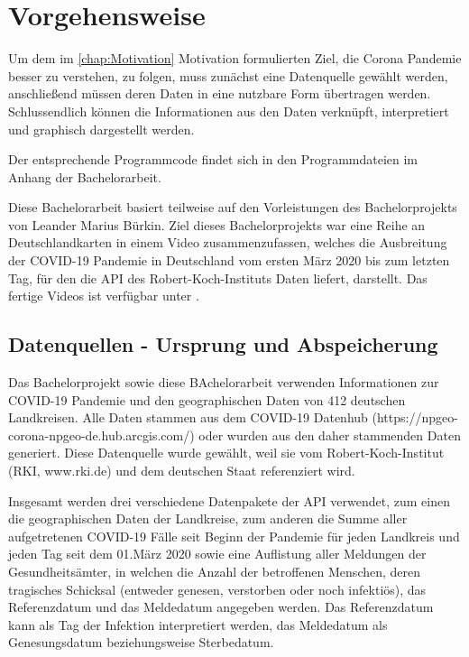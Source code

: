 \chapter{Vorgehensweise}\label{chap:Vorgehensweise}
Um dem im \autoref{chap:Motivation} \glqq{}Motivation\grqq{} formulierten Ziel, die Corona Pandemie besser zu verstehen, zu folgen, muss zunächst eine Datenquelle gewählt werden, anschließend müssen deren Daten in eine nutzbare Form übertragen werden. Schlussendlich können die Informationen aus den Daten verknüpft, interpretiert und graphisch dargestellt werden.

Der entsprechende Programmcode findet sich in den Programmdateien im Anhang der Bachelorarbeit. 

Diese Bachelorarbeit basiert teilweise auf den Vorleistungen des Bachelorprojekts von Leander Marius Bürkin.
Ziel dieses Bachelorprojekts war eine Reihe an Deutschlandkarten in einem Video zusammenzufassen, welches die Ausbreitung der COVID-19 Pandemie in Deutschland vom ersten März 2020 bis zum letzten Tag, für den die API des Robert-Koch-Instituts Daten liefert, darstellt.
Das fertige Videos ist verfügbar unter .

\section{Datenquellen - Ursprung und Abspeicherung}\label{sec:Datenquelle}

Das Bachelorprojekt sowie diese BAchelorarbeit verwenden Informationen zur COVID-19 Pandemie und den geographischen Daten von 412 deutschen Landkreisen. Alle Daten stammen aus dem \glqq{}COVID-19 Datenhub\grqq{} (https://npgeo-corona-npgeo-de.hub.arcgis.com/) oder wurden aus den daher stammenden Daten generiert. Diese Datenquelle wurde gewählt, weil sie vom Robert-Koch-Institut (RKI, www.rki.de) und dem deutschen Staat referenziert wird.

Insgesamt werden drei verschiedene Datenpakete der API verwendet, zum einen die geographischen Daten der Landkreise, zum anderen die Summe aller aufgetretenen COVID-19 Fälle seit Beginn der Pandemie für jeden Landkreis und jeden Tag seit dem 01.März 2020 sowie eine Auflistung aller Meldungen der Gesundheitsämter, in welchen die Anzahl der betroffenen Menschen, deren tragisches Schicksal (entweder genesen, verstorben oder noch infektiös), das  Referenzdatum und das Meldedatum angegeben werden. Das Referenzdatum kann als Tag der Infektion interpretiert werden, das Meldedatum als Genesungsdatum beziehungsweise Sterbedatum.

